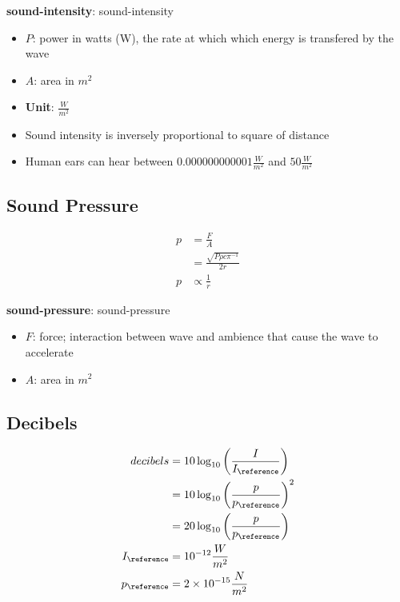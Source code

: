     \textbf{\Gls{sound-intensity}}: \glsdesc{sound-intensity}

    \begin{itemize}
      \item $ P $: power in watts (W), the rate at which which energy is
      transfered by the wave
      \item $ A $: area in $ m^{2} $
      \item \textbf{Unit}: $ \frac{W}{m^{2}} $
      \item Sound intensity is inversely proportional to square of distance
      \item Human ears can hear between $ 0.000000000001 \frac{W}{m^{2}} $ and
      $ 50 \frac{W}{m^{2}} $
    \end{itemize}

  \subsection{Sound Pressure}

    \begin{align}
      p &= \frac{F}{A} \\
      &= \frac{\sqrt{P \rho c \pi^{-1}}}{2r} \\
      p &\propto \frac{1}{r}
    \end{align}

    \textbf{\Gls{sound-pressure}}: \glsdesc{sound-pressure}

    \begin{itemize}
      \item $ F $: force; interaction between wave and ambience that cause the
      wave to accelerate
      \item $ A $: area in $ m^{2} $
    \end{itemize}

  \subsection{Decibels}

    \begin{align}
      decibels &= 10 \log_{10}\left( \frac{I}{I_{\reference}} \right) \\
      &= 10 \log_{10} \left( \frac{p}{p_{\reference}} \right)^{2} \\
      &= 20 \log_{10} \left( \frac{p}{p_{\reference}} \right) \\
      I_{\reference} &= 10^{-12} \frac{W}{m^{2}} \\
      p_{\reference} &= 2 \times 10^{-15} \frac{N}{m^{2}}
    \end{align}


